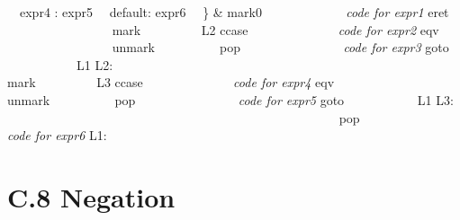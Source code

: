 \begin{center}
{ \ \ expr4 : expr5\newline
 \ \ default: expr6\newline
 \ \ \} &
\centering\arraybslash mark0 \ \ \ \ \ \ \ \ \ \ \ \ \textit{\newline
code for expr1}\newline
eret \ \ \ \ \ \ \ \ \ \ \ \ \ \ \ \ \newline
mark \ \ \ \ \ \ \ \ \ L2\newline
ccase \ \ \ \ \ \ \ \ \ \ \ \ \ \newline
\textit{code for expr2\newline
}eqv \ \ \ \ \ \ \ \ \ \ \ \ \ \ \ \ \newline
unmark \ \ \ \ \ \ \ \ \ \newline
pop \ \ \ \ \ \ \ \ \ \ \ \ \ \ \ \textit{\newline
code for expr3\newline
}goto \ \ \ \ \ \ \ \ \ \ \ L1\newline
L2: \ \ \ \ \ \ \ \ \ \ \ \ \ \ \ \ \ \ \ \ \ \ \ \ \ \ \ \ \ \ \ \ \ \ \ \ \ \ \ \ \ \ \ \ \ \ \ \ \ \ \ \ \newline
mark \ \ \ \ \ \ \ \ \ L3\newline
ccase \ \ \ \ \ \ \ \ \ \ \ \ \ \newline
\textit{code for expr4\newline
}eqv \ \ \ \ \ \ \ \ \ \ \ \ \ \ \ \ \newline
unmark \ \ \ \ \ \ \ \ \ \newline
pop \ \ \ \ \ \ \ \ \ \ \ \ \ \ \ \textit{\newline
code for expr5\newline
}goto \ \ \ \ \ \ \ \ \ \ \ L1\newline
L3: \ \ \ \ \ \ \ \ \ \ \ \ \ \ \ \ \ \ \ \ \ \ \ \ \ \ \ \ \ \ \ \ \ \ \ \ \ \ \ \ \ \ \ \ \ \ \ \ \ \ \ \ \newline
pop \ \ \ \ \ \ \ \ \ \ \ \ \ \ \ \newline
\textit{code for expr6\newline
}L1: \ \ \ \ \ \ \ \ \ \ \ \ \ \ \ \ \ \ \ \ \ \ \ \ \ \ \ \ \ \ \ \ \ \ \ \ \ \ \ \ \ \ \ \ \ \ \ \ \ \ \ \ \\}
\tabletail{}
\tablelasttail{}

\end{center}


\section[C.8 Negation]{C.8 Negation}

